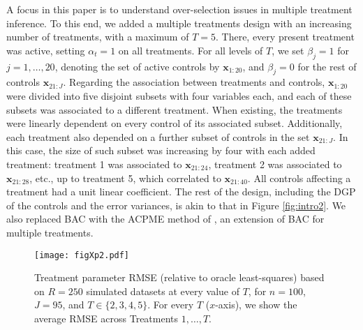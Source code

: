 \documentclass[12pt]{article}
\newcommand{\mb}[1]{\mathbf{#1}}
\newcommand{\bx}{{\mb{x}}}
\newcommand{\balpha}{{\bm{\alpha}}}
\begin{document}
A focus in this paper is to understand over-selection issues in multiple treatment inference.
To this end, we added a multiple treatments design with an increasing number of treatments, with a maximum of $T=5$. There, every present treatment was active, setting $\alpha_t = 1$ on all treatments. For all levels of $T$, we set $\beta_j = 1$ for $j = 1, \dots, 20$, denoting the set of active controls by $\bx_{1:20}$, and $\beta_j = 0$ for the rest of controls $\bx_{21:J}$. Regarding the association between treatments and controls, $\bx_{1:20}$ were divided into five disjoint subsets with four variables each, and each of these subsets was associated to a different treatment. When existing, the treatments were linearly dependent on every control of its associated subset. Additionally, each treatment also depended on a further subset of controls in the set $\bx_{21:J}$. In this case, the size of such subset was increasing by four with each added treatment: treatment 1 was associated to $\bx_{21:24}$, treatment 2 was associated to $\bx_{21:28}$, etc., up to treatment 5, which correlated to $\bx_{21:40}$. All controls affecting a treatment had a unit linear coefficient. The rest of the design, including the DGP of the controls and the error variances, is akin to that in Figure \ref{fig:intro2}.
We also replaced BAC with the ACPME method %
of \citep{Wilson18}, an extension of BAC for multiple treatments.

\begin{figure}[h]
\centering
\texttt{[image: figXp2.pdf]} 
\caption{Treatment parameter RMSE (relative to oracle least-squares) based on $R=250$ simulated datasets at every value of $T$, for $n=100$, $J=95$, and $T \in \{2, 3, 4, 5 \}$. For every $T$ ($x$-axis), we show the average RMSE across Treatments $1,\ldots,T$.
}%
\label{fig:multitreat_uncounfounded}
\end{figure}
\end{document}
